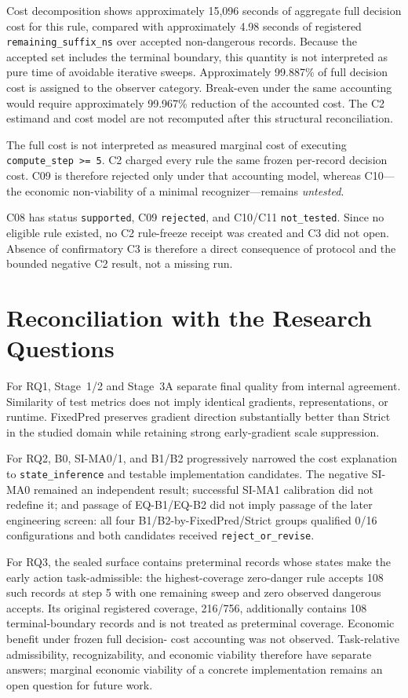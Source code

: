 Cost decomposition shows approximately 15,096 seconds of aggregate full decision cost
for this rule, compared with approximately 4.98 seconds of registered
\texttt{remaining\_suffix\_ns} over accepted non-dangerous records. Because the
accepted set includes the terminal boundary, this quantity is not interpreted as pure
time of avoidable iterative sweeps. Approximately 99.887\% of full decision cost is
assigned to the observer category. Break-even under the same accounting would require
approximately 99.967\% reduction of the accounted cost. The C2 estimand and cost model
are not recomputed after this structural reconciliation.

The full cost is not interpreted as measured marginal cost of executing
\texttt{compute\_step >= 5}. C2 charged every rule the same frozen per-record decision
cost. C09 is therefore rejected only under that accounting model, whereas C10---the
economic non-viability of a minimal recognizer---remains \emph{untested}.

C08 has status \texttt{supported}, C09 \texttt{rejected}, and C10/C11
\texttt{not\_tested}. Since no eligible rule existed, no C2 rule-freeze receipt was
created and C3 did not open. Absence of confirmatory C3 is therefore a direct
consequence of protocol and the bounded negative C2 result, not a missing run.

\section{Reconciliation with the Research Questions}
\label{sec:results-rq-reconciliation-en}

For RQ1, Stage~1/2 and Stage~3A separate final quality from internal agreement.
Similarity of test metrics does not imply identical gradients, representations, or
runtime. FixedPred preserves gradient direction substantially better than Strict in the
studied domain while retaining strong early-gradient scale suppression.

For RQ2, B0, SI-MA0/1, and B1/B2 progressively narrowed the cost explanation to
\texttt{state\_inference} and testable implementation candidates. The negative SI-MA0
remained an independent result; successful SI-MA1 calibration did not redefine it;
and passage of EQ-B1/EQ-B2 did not imply passage of the later engineering screen: all
four B1/B2-by-FixedPred/Strict groups qualified 0/16 configurations and both candidates
received \texttt{reject\_or\_revise}.

For RQ3, the sealed surface contains preterminal records whose states make the early
action task-admissible: the highest-coverage zero-danger rule accepts 108 such records
at step 5 with one remaining sweep and zero observed dangerous accepts. Its original
registered coverage, 216/756, additionally contains 108 terminal-boundary records and
is not treated as preterminal coverage. Economic benefit under frozen full decision-
cost accounting was not observed. Task-relative admissibility, recognizability, and
economic viability therefore have separate answers; marginal economic viability of a
concrete implementation remains an open question for future work.
